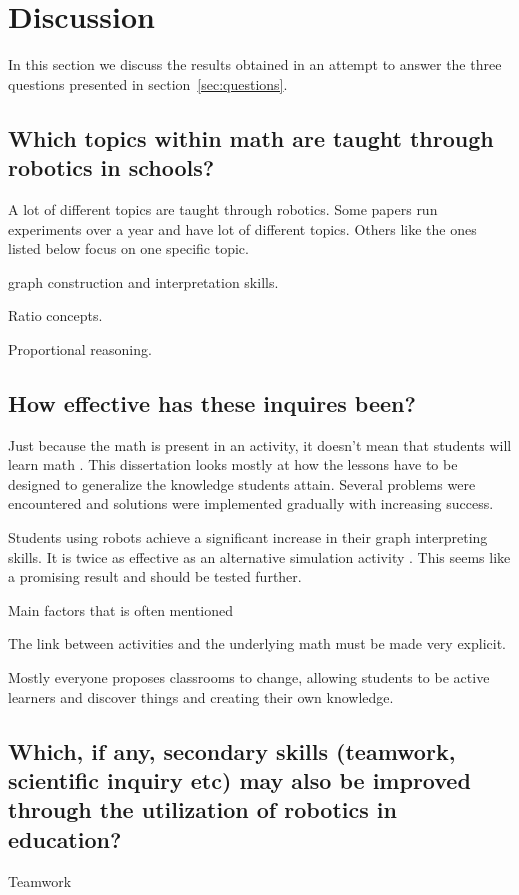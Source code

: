 \section*{Discussion}
In this section we discuss the results obtained in an attempt to answer the three questions presented in section~\ref{sec:questions}.

\subsection*{Which topics within math are taught through robotics in schools?}

A lot of different topics are taught through robotics. Some papers run experiments over a year and have lot of different topics. Others like the ones listed below focus on one specific topic.

 graph construction and interpretation skills.

\bigskip\noindent
{} Ratio concepts. 

\bigskip\noindent
{} Proportional reasoning.

\subsection*{How effective has these inquires been?}
Just because the math is present in an activity, it doesn't mean that students will learn math . This dissertation looks mostly at how the lessons have to be designed to generalize the knowledge students attain. Several problems were encountered and solutions were implemented gradually with increasing success.

\bigskip\noindent
Students using robots achieve a significant increase in their graph interpreting skills. It is twice as effective as an alternative simulation activity . This seems like a promising result and should be tested further. 

\bigskip\noindent
Main factors that is often mentioned

\bigskip\noindent
The link between activities and the underlying math must be made very explicit. 

\bigskip\noindent
Mostly everyone proposes classrooms to change, allowing students to be active learners and discover things and creating their own knowledge.

\subsection*{Which, if any, secondary skills (teamwork, scientific inquiry etc) may also be improved through the utilization of robotics in education?}

\bigskip\noindent
Teamwork \cite{mitnik2009collaborative, }

